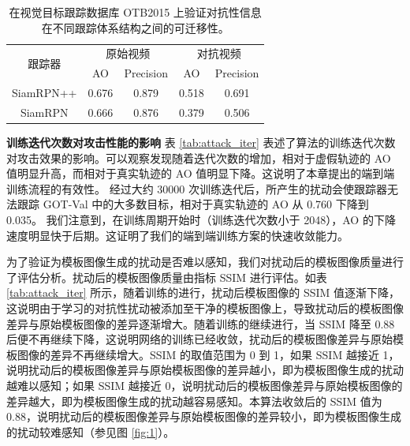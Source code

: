 \begin{table}[t]
\caption{在视觉目标跟踪数据库 OTB2015 上验证对抗性信息在不同跟踪体系结构之间的可迁移性。}
\centering
\begin{tabular}{ccccc} 
\toprule
\multirow{2}{*}[-2pt]{跟踪器} & \multicolumn{2}{c}{原始视频} & \multicolumn{2}{c}{对抗视频}  \\
\cmidrule(lr){2-3} \cmidrule(lr){4-5}
                          & AO & Precision              & AO & Precision                   \\
\midrule
SiamRPN++                 & 0.676   & 0.879                  & 0.518   & 0.691                       \\
SiamRPN                   & 0.666   & 0.876                  & 0.379   & 0.506                       \\
\bottomrule
\end{tabular}
\label{tab:arch}
\end{table}

\textbf{训练迭代次数对攻击性能的影响} 表 \ref{tab:attack_iter} 表述了算法的训练迭代次数对攻击效果的影响。可以观察发现随着迭代次数的增加，相对于虚假轨迹的 AO 值明显升高，而相对于真实轨迹的 AO 值明显下降。这说明了本章提出的端到端训练流程的有效性。
经过大约 30000 次训练迭代后，所产生的扰动会使跟踪器无法跟踪 GOT-Val 中的大多数目标，相对于真实轨迹的 AO 从 0.760 下降到 0.035。
我们注意到，在训练周期开始时（训练迭代次数小于 2048），AO 的下降速度明显快于后期。这证明了我们的端到端训练方案的快速收敛能力。

为了验证为模板图像生成的扰动是否难以感知，我们对扰动后的模板图像质量进行了评估分析。扰动后的模板图像质量由指标 SSIM 进行评估。如表 \ref{tab:attack_iter} 所示，随着训练的进行，扰动后模板图像的 SSIM 值逐渐下降，这说明由于学习的对抗性扰动被添加至干净的模板图像上，导致扰动后的模板图像差异与原始模板图像的差异逐渐增大。随着训练的继续进行，当 SSIM 降至 0.88 后便不再继续下降，这说明网络的训练已经收敛，扰动后的模板图像差异与原始模板图像的差异不再继续增大。SSIM 的取值范围为 0 到 1，如果 SSIM 越接近 1，说明扰动后的模板图像差异与原始模板图像的差异越小，即为模板图像生成的扰动越难以感知；如果 SSIM 越接近 0，说明扰动后的模板图像差异与原始模板图像的差异越大，即为模板图像生成的扰动越容易感知。本算法收敛后的 SSIM 值为 0.88，说明扰动后的模板图像差异与原始模板图像的差异较小，即为模板图像生成的扰动较难感知（参见图 \ref{fig:1}）。

